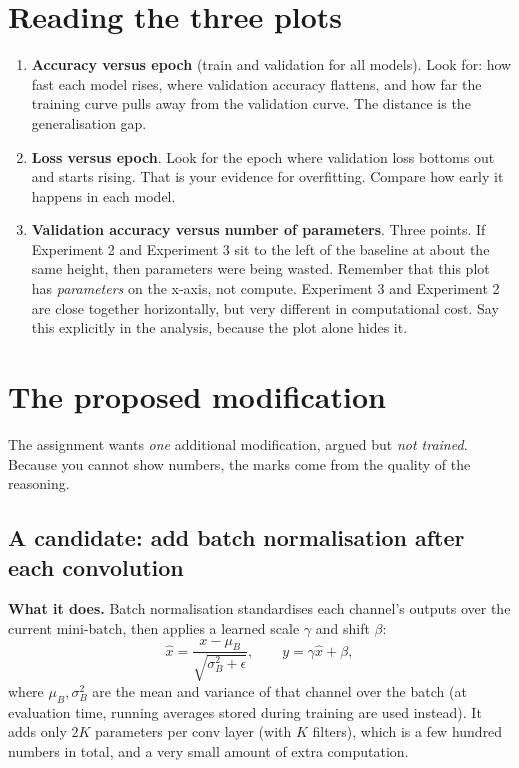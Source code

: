 \documentclass[11pt]{article}
\newcommand{\key}[1]{\textbf{#1}}
\begin{document}
\section{Reading the three plots}

\begin{enumerate}
\item \key{Accuracy versus epoch} (train and validation for all models). Look for: how fast each model rises, where validation accuracy flattens, and how far the training curve pulls away from the validation curve. The distance is the generalisation gap.
\item \key{Loss versus epoch}. Look for the epoch where validation loss bottoms out and starts rising. That is your evidence for overfitting. Compare how early it happens in each model.
\item \key{Validation accuracy versus number of parameters}. Three points. If Experiment 2 and Experiment 3 sit to the left of the baseline at about the same height, then parameters were being wasted. Remember that this plot has \emph{parameters} on the x-axis, not compute. Experiment 3 and Experiment 2 are close together horizontally, but very different in computational cost. Say this explicitly in the analysis, because the plot alone hides it.
\end{enumerate}

\section{The proposed modification}

The assignment wants \emph{one} additional modification, argued but \emph{not trained}. Because you cannot show numbers, the marks come from the quality of the reasoning.

\subsection{A candidate: add batch normalisation after each convolution}

\key{What it does.} Batch normalisation standardises each channel's outputs over the current mini-batch, then applies a learned scale $\gamma$ and shift $\beta$:
\[
\hat x = \frac{x-\mu_B}{\sqrt{\sigma_B^2+\epsilon}}, \qquad y = \gamma\hat x + \beta ,
\]
where $\mu_B,\sigma_B^2$ are the mean and variance of that channel over the batch (at evaluation time, running averages stored during training are used instead). It adds only $2K$ parameters per conv layer (with $K$ filters), which is a few hundred numbers in total, and a very small amount of extra computation.
\end{document}
